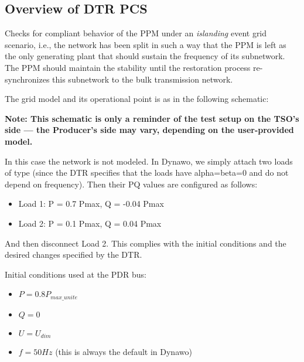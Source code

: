     \subsection{Overview of DTR PCS \DTRPcs}

    Checks for compliant behavior of the PPM under an \emph{islanding} event grid
    scenario, i.e., the network has been split in such a way that the PPM is left as
    the only generating plant that should sustain the frequency of its
    subnetwork. The PPM should maintain the stability until the restoration process
    re-synchronizes this subnetwork to the bulk transmission network.

    The grid model and its operational point is as in the following schematic:
    \begin{center}
        
    \end{center}
    \begin{center}
        \small \textbf{Note: This schematic is only a reminder of the test setup on the TSO's
        side --- the Producer's side may vary, depending on the user-provided model.}
    \end{center}

    In this case the network is not modeled. In Dynawo, we simply attach
    two loads of type  (since the DTR specifies that the
    loads have alpha=beta=0 and do not depend on frequency). Then their
    PQ values are configured as follows:
    \begin{itemize}
        \item Load 1: P = 0.7 Pmax, Q = -0.04 Pmax
        \item Load 2: P = 0.1 Pmax, Q = 0.04 Pmax
    \end{itemize}
    And then disconnect Load 2. This complies with the initial conditions
    and the desired changes specified by the DTR.

    \begin{description}
        \item Initial conditions used at the PDR bus:
        \begin{itemize}
            \item $P = 0.8 P_{max\_unite}$
            \item $Q = 0$
            \item $U = U_{dim}$
            \item $f = 50 Hz$ (this is always the default in Dynawo)
        \end{itemize}
    \end{description}


